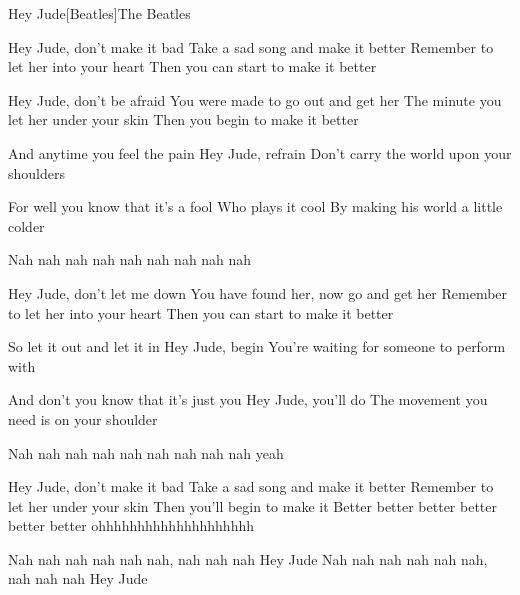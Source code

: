 \begin{Song}{Hey Jude}[Beatles]{The Beatles}
\begin{multicols}{2}

\begin{Verse}
Hey Jude, don't make it bad
Take a sad song and make it better
Remember to let her into your heart
Then you can start to make it better
\espaceInterStrophe

Hey Jude, don't be afraid
You were made to go out and get her
The minute you let her under your skin
Then you begin to make it better
\end{Verse}
\espaceInterStrophe

\begin{Chorus}
And anytime you feel the pain
Hey Jude, refrain
Don't carry the world upon your shoulders
\espaceInterStrophe

For well you know that it's a fool
Who plays it cool
By making his world a little colder
\espaceInterStrophe

Nah nah nah nah nah nah nah nah nah
\end{Chorus}
\espaceInterStrophe

\begin{Verse}
Hey Jude, don't let me down
You have found her, now go and get her
Remember to let her into your heart
Then you can start to make it better
\end{Verse}
\espaceInterStrophe

\begin{Chorus}
So let it out and let it in
Hey Jude, begin
You're waiting for someone to perform with
\espaceInterStrophe

And don't you know that it's just you
Hey Jude, you'll do
The movement you need is on your shoulder
\espaceInterStrophe

Nah nah nah nah nah nah nah nah nah yeah
\end{Chorus}
\espaceInterStrophe

\begin{Verse}
Hey Jude, don't make it bad
Take a sad song and make it better
Remember to let her under your skin
Then you'll begin to make it
Better better better better better better
ohhhhhhhhhhhhhhhhhhhh
\end{Verse}
\espaceInterStrophe

\begin{Chorus}
Nah nah nah nah nah nah, nah nah nah
Hey Jude
Nah nah nah nah nah nah, nah nah nah
Hey Jude
\adlib
\end{Chorus}
\vfill
~
\end{multicols}


\end{Song}
